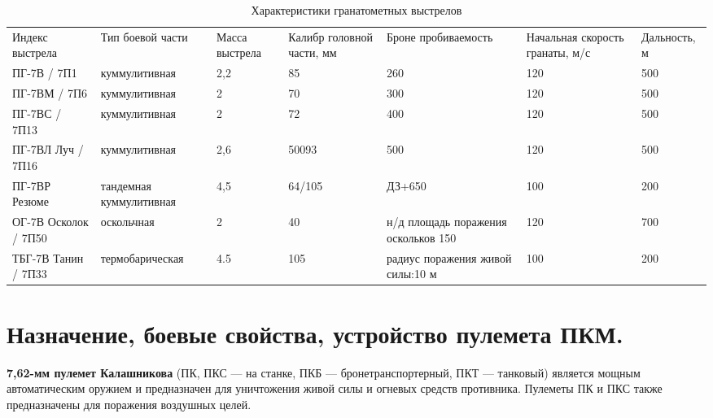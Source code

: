 \documentclass[12pt,a4paper]{report}
\begin{document}
\newpage
\begin{table}[h!]
	\centering
	\caption{Характеристики гранатометных выстрелов }
	\label{tab:bumbumgrante}
		\begin{sideways}
	\begin{tabular}{|p{2cm}| p{3cm}| p{1.8cm}| p{3cm} |p{2.5cm} |p{3cm} |p{2cm} |}
		\hline
		Индекс выстрела      & Тип боевой части        & Масса выстрела & Калибр головной части, мм & Броне пробиваемость                  & Начальная скорость гранаты, м/с & Дальность, м \\
		ПГ-7В / 7П1          & куммулитивная           & 2,2            & 85                        & 260                                 & 120                             & 500                      \\
		ПГ-7ВМ / 7П6         & куммулитивная           & 2              & 70                        & 300                                 & 120                             & 500                      \\
		ПГ-7ВС / 7П13        & куммулитивная           & 2              & 72                        & 400                                 & 120                             & 500                      \\
		ПГ-7ВЛ Луч / 7П16    & куммулитивная           & 2,6            & 50093                     & 500                                 & 120                             & 500                      \\
		ПГ-7ВР Резюме        & тандемная куммулитивная & 4,5            & 64/105                    & ДЗ+650                              & 100                             & 200                      \\
		ОГ-7В Осколок / 7П50 & оскольчная              & 2              & 40                        & н/д площадь поражения оскольков 150 & 120                             & 700                      \\
		ТБГ-7В Танин / 7П33  & термобарическая         & 4.5            & 105                       & радиус поражения живой силы:10 м    & 100                             & 200                     \\
		\hline
	\end{tabular}
\end{sideways}
\end{table}



\newpage

\section{Назначение, боевые свойства, устройство пулемета ПКМ.}
\textbf{7,62-мм пулемет Калашникова} (ПК, ПКС — на станке, ПКБ — бронетранспортерный, ПКТ — танковый) является мощным автоматическим оружием и предназначен для уничтожения живой силы и огневых средств противника. Пулеметы ПК и ПКС также предназначены для поражения воздушных целей.
\end{document}
